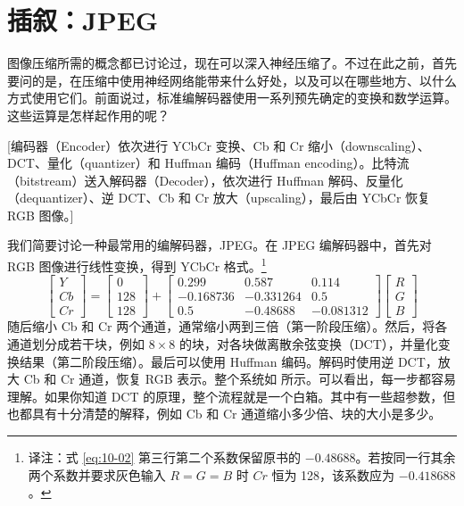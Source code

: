 \section{插叙：JPEG}
\label{sec:10-03}

图像压缩所需的概念都已讨论过，现在可以深入神经压缩了。不过在此之前，首先要问的是，在压缩中使用神经网络能带来什么好处，以及可以在哪些地方、以什么方式使用它们。前面说过，标准编解码器使用一系列预先确定的变换和数学运算。这些运算是怎样起作用的呢？

[编码器（Encoder）依次进行 YCbCr 变换、Cb 和 Cr 缩小（downscaling）、DCT、量化（quantizer）和 Huffman 编码（Huffman encoding）。比特流（bitstream）送入解码器（Decoder），依次进行 Huffman 解码、反量化（dequantizer）、逆 DCT、Cb 和 Cr 放大（upscaling），最后由 YCbCr 恢复 RGB 图像。]

我们简要讨论一种最常用的编解码器，JPEG。在 JPEG 编解码器中，首先对 RGB 图像进行线性变换，得到 YCbCr 格式。\footnote{译注：式 \eqref{eq:10-02} 第三行第二个系数保留原书的 $-0.48688$。若按同一行其余两个系数并要求灰色输入 $R=G=B$ 时 $Cr$ 恒为 128，该系数应为 $-0.418688$。}
\begin{equation}
  \begin{bmatrix}Y\\Cb\\Cr\end{bmatrix}
  =
  \begin{bmatrix}0\\128\\128\end{bmatrix}
  +
  \begin{bmatrix}
    0.299&0.587&0.114\\
    -0.168736&-0.331264&0.5\\
    0.5&-0.48688&-0.081312
  \end{bmatrix}
  \begin{bmatrix}R\\G\\B\end{bmatrix}
  \tag{10.2}\label{eq:10-02}
\end{equation}
随后缩小 Cb 和 Cr 两个通道，通常缩小两到三倍（第一阶段压缩）。然后，将各通道划分成若干块，例如 $8\times8$ 的块，对各块做离散余弦变换（DCT），并量化变换结果（第二阶段压缩）。最后可以使用 Huffman 编码。解码时使用逆 DCT，放大 Cb 和 Cr 通道，恢复 RGB 表示。整个系统如 所示。可以看出，每一步都容易理解。如果你知道 DCT 的原理，整个流程就是一个白箱。其中有一些超参数，但也都具有十分清楚的解释，例如 Cb 和 Cr 通道缩小多少倍、块的大小是多少。

